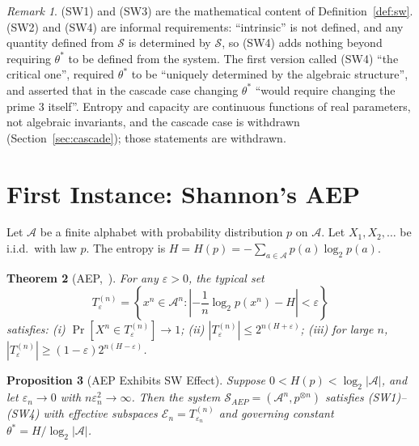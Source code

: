 \documentclass[12pt]{amsart}
\theoremstyle{plain}
\newtheorem{theorem}{Theorem}[section]
\newtheorem{proposition}[theorem]{Proposition}
\theoremstyle{definition}
\theoremstyle{remark}
\newtheorem{remark}[theorem]{Remark}
\begin{document}
\begin{remark}
\label{rem:sw-informal}
(SW1) and (SW3) are the mathematical content of Definition~\ref{def:sw}. (SW2)
and (SW4) are informal requirements: ``intrinsic'' is not defined, and any
quantity defined from $\mathcal{S}$ is determined by $\mathcal{S}$, so (SW4) adds
nothing beyond requiring $\theta^*$ to be defined from the system. The first
version called (SW4) ``the critical one'', required $\theta^*$ to be ``uniquely
determined by the algebraic structure'', and asserted that in the cascade case
changing $\theta^*$ ``would require changing the prime $3$ itself''. Entropy and
capacity are continuous functions of real parameters, not algebraic invariants,
and the cascade case is withdrawn (Section~\ref{sec:cascade}); those statements
are withdrawn.
\end{remark}

\section{First Instance: Shannon's AEP}

Let $\mathcal{A}$ be a finite alphabet with probability distribution $p$ on
$\mathcal{A}$. Let $X_1, X_2, \ldots$ be i.i.d.\ with law $p$. The entropy is
$H = H(p) = -\sum_{a \in \mathcal{A}} p(a) \log_2 p(a)$.

\begin{theorem}[AEP,~{\cite[Theorem~3.1.2]{CoverThomas2006}}]
\label{thm:aep}
For any $\varepsilon > 0$, the typical set
\[
  T_\varepsilon^{(n)} = \left\{ x^n \in \mathcal{A}^n :
    \left| -\frac{1}{n} \log_2 p(x^n) - H \right| < \varepsilon \right\}
\]
satisfies: \emph{(i)} $\Pr[X^n \in T_\varepsilon^{(n)}] \to 1$;
\emph{(ii)} $|T_\varepsilon^{(n)}| \leq 2^{n(H+\varepsilon)}$;
\emph{(iii)} for large $n$, $|T_\varepsilon^{(n)}| \geq (1-\varepsilon)2^{n(H-\varepsilon)}$.
\end{theorem}

\begin{proposition}[AEP Exhibits SW Effect]
\label{prop:aep-sw}
Suppose $0 < H(p) < \log_2|\mathcal{A}|$, and let $\varepsilon_n \to 0$ with
$n\varepsilon_n^2 \to \infty$. Then the system
$\mathcal{S}_{AEP} = (\mathcal{A}^n, p^{\otimes n})$ satisfies
\emph{(SW1)--(SW4)} with effective subspaces
$\mathcal{E}_n = T_{\varepsilon_n}^{(n)}$ and governing constant
$\theta^* = H/\log_2|\mathcal{A}|$.
\end{proposition}
\end{document}
